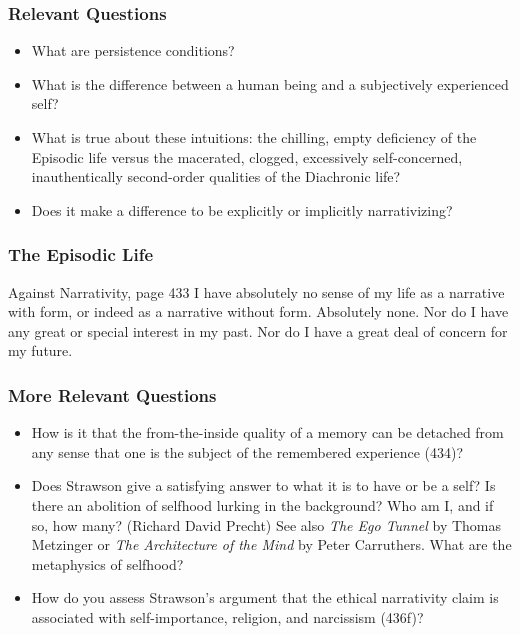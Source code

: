 \documentclass[xcolor=dvipsnames]{beamer}
\begin{document}
\begin{frame}
  \frametitle{Relevant Questions}
  \begin{itemize}
  \item What are persistence conditions?
  \item What is the difference between a human being and a subjectively
    experienced self?
  \item What is true about these intuitions: the chilling, empty
    deficiency of the Episodic life versus the macerated, clogged,
    excessively self-concerned, inauthentically second-order qualities
    of the Diachronic life?
  \item Does it make a difference to be explicitly or implicitly
    narrativizing?
  \end{itemize}
\end{frame}

\begin{frame}
  \frametitle{The Episodic Life}
  \begin{block}{Against Narrativity, page 433}
    I have absolutely no sense of my life as a narrative with form, or
    indeed as a narrative without form. Absolutely none. Nor do I have
    any great or special interest in my past. Nor do I have a great
    deal of concern for my future.
  \end{block}
\end{frame}

\begin{frame}
  \frametitle{More Relevant Questions}
  \begin{itemize}
  \item How is it that the from-the-inside quality of a memory can be
    detached from any sense that one is the subject of the remembered
    experience (434)?
  \item Does Strawson give a satisfying answer to what it is to have
    or be a self? Is there an abolition of selfhood lurking in the
    background? Who am I, and if so, how many? (Richard David Precht)
    See also \emph{The Ego Tunnel} by Thomas Metzinger or \emph{The
      Architecture of the Mind} by Peter Carruthers. What are the
    metaphysics of selfhood?
  \item How do you assess Strawson's argument that the ethical
    narrativity claim is associated with self-importance, religion,
    and narcissism (436f)?
  \end{itemize}
\end{frame}
\end{document}
